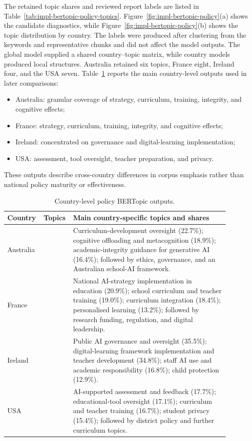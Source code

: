 The retained topic shares and reviewed report labels are listed in
Table~\ref{tab:impl-bertopic-policy-topics}. Figure~\ref{fig:impl-bertopic-policy}(a)
shows the candidate diagnostics, while Figure~\ref{fig:impl-bertopic-policy}(b)
shows the topic distribution by country. The labels were produced after clustering
from the keywords and representative chunks and did not affect the model outputs.
The global model supplied a shared country--topic matrix, while country models
produced local structures. Australia retained six topics, France eight, Ireland four,
and the USA seven. Table~\ref{tab:impl-bertopic-policy-countries} reports the main
country-level outputs used in later comparisons:
\begin{itemize}
  \item Australia: granular coverage of strategy, curriculum, training, integrity,
  and cognitive effects;
  \item France: strategy, curriculum, training, integrity, and cognitive effects;
  \item Ireland: concentrated on governance and digital-learning implementation;
  \item USA: assessment, tool oversight, teacher preparation, and privacy.
\end{itemize}
These outputs describe cross-country differences in corpus emphasis rather than
national policy maturity or effectiveness.

\begin{table}[ht]
\centering
\footnotesize
\begin{tabular}{
  >{\centering\arraybackslash}p{0.12\linewidth}
  >{\centering\arraybackslash}p{0.10\linewidth}
  >{\raggedright\arraybackslash}p{0.68\linewidth}
}
\hline
Country & Topics & Main country-specific topics and shares \\
\hline
Australia & 6 & Curriculum-development oversight (22.7\%); cognitive offloading
and metacognition (18.9\%); academic-integrity guidance for generative AI (16.4\%);
followed by ethics, governance, and an Australian school-AI framework. \\
France & 8 & National AI-strategy implementation in education (20.9\%); school
curriculum and teacher training (19.0\%); curriculum integration (18.4\%);
personalised learning (13.2\%); followed by research funding, regulation, and digital
leadership. \\
Ireland & 4 & Public AI governance and oversight (35.5\%); digital-learning
framework implementation and teacher development (34.8\%); staff AI use and academic
responsibility (16.8\%); child protection (12.9\%). \\
USA & 7 & AI-supported assessment and feedback (17.7\%); educational-tool
oversight (17.1\%); curriculum and teacher training (16.7\%); student privacy
(15.4\%); followed by district policy and further curriculum topics. \\
\hline
\end{tabular}
\caption{Country-level policy BERTopic outputs.}
\label{tab:impl-bertopic-policy-countries}
\end{table}

